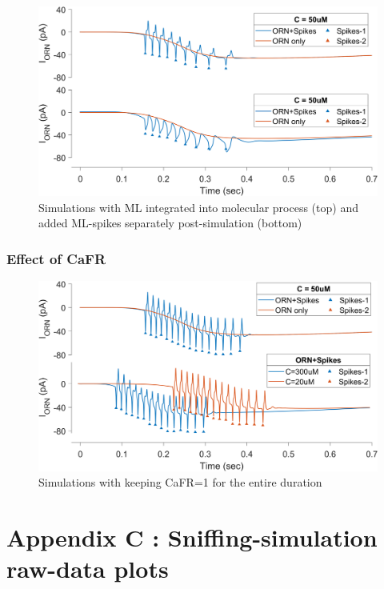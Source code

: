 \documentclass[
]{article}
\begin{document}
\begin{figure}

{\centering \includegraphics[width=0.7\linewidth]{figs/Appendix/supp_fig_ML_spikes_OVERLAP} 

}

\caption{Simulations with ML integrated into molecular process (top) and added ML-spikes separately post-simulation (bottom)}\label{fig:MLover}
\end{figure}

\hypertarget{effect-of-cafr}{%
\subsubsection*{Effect of CaFR}\label{effect-of-cafr}}

\begin{figure}

{\centering \includegraphics[width=0.7\linewidth]{figs/Appendix/supp_fig_ML_ID_w_CaFR_1} 

}

\caption{Simulations with keeping CaFR=1 for the entire duration}\label{fig:aCaFR1}
\end{figure}

\clearpage

\hypertarget{appendix-c-sniffing-simulation-raw-data-plots}{%
\section*{Appendix C : Sniffing-simulation raw-data plots}\label{appendix-c-sniffing-simulation-raw-data-plots}}
\end{document}
